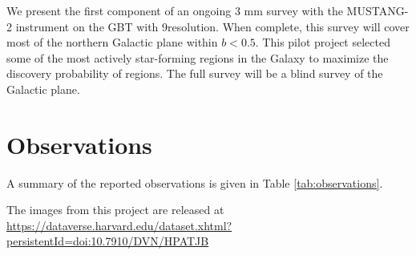 \documentclass[twocolumn]{aastex62}
\newcommand{\MUSTANG}{MUSTANG-2\xspace}
\begin{document}

We present the first component of an ongoing 3 mm survey with the \MUSTANG
instrument on the GBT with 9\arcsec resolution.   When complete, this survey
will cover most of the northern Galactic plane within $b<0.5$.  
This pilot project selected some of the most actively star-forming regions in
the Galaxy to maximize the discovery probability of \hchii regions.  The full
survey will be a blind survey of the Galactic plane.


\section{Observations}

A summary of the reported observations is given in Table \ref{tab:observations}.

The images from this project are released at
\url{https://dataverse.harvard.edu/dataset.xhtml?persistentId=doi:10.7910/DVN/HPATJB}
\end{document}
